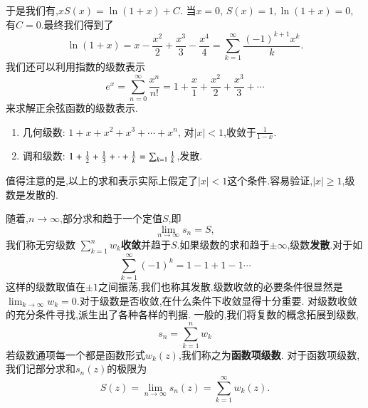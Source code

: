 于是我们有,$
    x S(x) = \ln (1 + x) + C .$
当$x=0$, $S(x) = 1, \ln (1+x) = 0$, 有$C=0$.最终我们得到了
\begin{equation}
    \ln (1+x) = x -  \frac{x^2}{2} + \frac{x^3}{3} - \frac{x^4}{4} = \sum_{k=1}^{\infty} \frac{(-1)^{k+1} x^k}{k} .
\end{equation}
我们还可以利用指数的级数表示
\begin{equation}
    e^{x} = \sum_{n=0}^{\infty} \frac{x^n}{n!} = 1 + \frac{x}{1} + \frac{x^2}{2} + \frac{x^3}{3} + \cdots 
\end{equation}
来求解正余弦函数的级数表示.
\begin{enumerate}
    \item 几何级数: $ 1 + x + x^2 + x^3 + \cdots + x^n$, 对$|x|<1$,收敛于$\frac{1}{1-x}$.
    \item 调和级数: $ 1 + {\frac{1}{2}} + \frac{1}{3} + \cdot +\frac{1}{k} = \sum_{k=1} \frac{1}{k}$,发散.
\end{enumerate}

值得注意的是,以上的求和表示实际上假定了$|x|<1$这个条件.容易验证,$|x|\geq 1$,级数是发散的.

随着,$n\to \infty$,部分求和趋于一个定值$S$,即
\begin{equation}
    \lim_{n\to \infty} s_n = S ,
\end{equation}
我们称无穷级数 $\sum_{k=1}^{n} w_{k}${\bf 收敛}并趋于$S$.如果级数的求和趋于$\pm \infty$,级数{\bf 发散}.对于如
\begin{equation}
    \sum_{k=1}^{\infty} (-1)^k = 1 - 1 + 1 - 1 \cdots 
\end{equation}
这样的级数取值在$\pm 1$之间振荡,我们也称其发散.级数收敛的必要条件很显然是$\lim_{k\to \infty} w_k = 0$.对于级数是否收敛,在什么条件下收敛显得十分重要.
对级数收敛的充分条件寻找,派生出了各种各样的判据.
一般的,我们将复数的概念拓展到级数,
\begin{equation}
    s_n = \sum_{k=1}^{n} w_{k}
\end{equation}
若级数通项每一个都是函数形式$w_k(z)$,我们称之为\textbf{函数项级数}.
对于函数项级数,我们记部分求和$s_n(z)$的极限为
\begin{equation}
    S(z) = \lim_{n\to \infty} s_n(z) =  \sum_{k=1}^{\infty} w_k (z). 
\end{equation}


